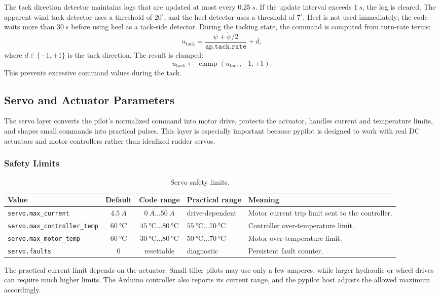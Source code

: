 \documentclass[10pt,twocolumn]{article}
\begin{document}
The tack direction detector maintains logs that are updated at most every
\(\SI{0.25}{s}\).  If the update interval exceeds \(\SI{1}{s}\), the log
is cleared.  The apparent-wind tack detector uses a threshold of
\(20^\circ\), and the heel detector uses a threshold of \(7^\circ\).  Heel
is not used immediately; the code waits more than \(\SI{30}{s}\) before
using heel as a tack-side detector.
During the tacking state, the command is computed from turn-rate terms:
\[
u_{\mathrm{tack}}
=
\frac{\dot{\psi}+\ddot{\psi}/2}
{\texttt{ap.tack.rate}}
+
d,
\]
where \(d\in\{-1,+1\}\) is the tack direction.  The result is clamped:
\[
u_{\mathrm{tack}}
\leftarrow
\operatorname{clamp}(u_{\mathrm{tack}},-1,+1).
\]
This prevents excessive command values during the tack.
\subsection{Servo and Actuator Parameters}
The servo layer converts the pilot's normalized command into motor drive,
protects the actuator, handles current and temperature limits, and shapes
small commands into practical pulses.  This layer is especially important
because pypilot is designed to work with real DC actuators and motor
controllers rather than idealized rudder servos.
\subsubsection{Safety Limits}
\begin{table}[!tbp]
\centering
\caption{Servo safety limits.}
\label{tab:pypilot-servo-safety}
\begin{tabularx}{\textwidth}{Z{0.23\textwidth}c c Z{0.16\textwidth}Y}
\toprule
Value & Default & Code range & Practical range & Meaning \\
\midrule
\texttt{servo.max\_current} &
\(\SI{4.5}{A}\) &
\(\SI{0}{A}\ldots\SI{50}{A}\) &
drive-dependent &
Motor current trip limit sent to the controller. \\
\texttt{servo.max\_controller\_temp} &
\(\SI{60}{\celsius}\) &
\(\SI{45}{\celsius}\ldots\SI{80}{\celsius}\) &
\(\SI{55}{\celsius}\ldots\SI{70}{\celsius}\) &
Controller over-temperature limit. \\
\texttt{servo.max\_motor\_temp} &
\(\SI{60}{\celsius}\) &
\(\SI{30}{\celsius}\ldots\SI{80}{\celsius}\) &
\(\SI{50}{\celsius}\ldots\SI{70}{\celsius}\) &
Motor over-temperature limit. \\
\texttt{servo.faults} &
\num{0} &
resettable &
diagnostic &
Persistent fault counter. \\
\bottomrule
\end{tabularx}
\end{table}
The practical current limit depends on the actuator.  Small tiller pilots
may use only a few amperes, while larger hydraulic or wheel drives can
require much higher limits.  The Arduino controller also reports its
current range, and the pypilot host adjusts the allowed maximum
accordingly.
\end{document}
